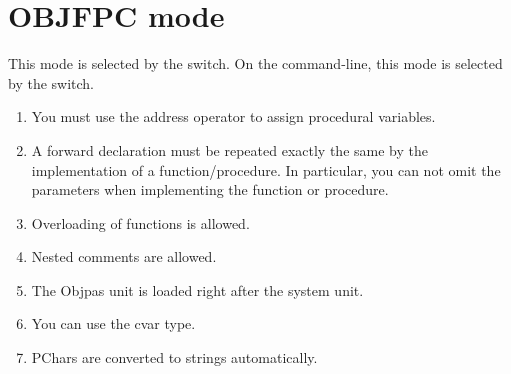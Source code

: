 \documentclass{report}
\begin{document}
\section{OBJFPC mode}
This mode is selected by the  switch. On the command-line,
this mode is selected by the  switch.
\begin{enumerate}
\item You must use the address operator to assign procedural variables.
\item A forward declaration must be repeated exactly the same by the
implementation of a function/procedure. In particular, you can not omit the
parameters when implementing the function or procedure.
\item Overloading of functions is allowed.
\item Nested comments are allowed.
\item The Objpas unit is loaded right after the system unit.
\item You can use the cvar type.
\item PChars are converted to strings automatically.
\end{enumerate}
\end{document}
